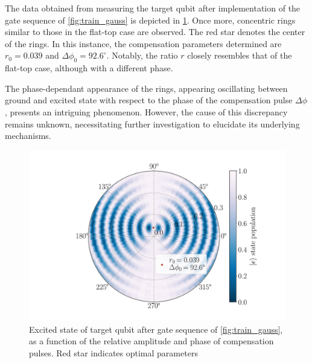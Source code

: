
The data obtained from measuring the target qubit after implementation of the gate sequence of \cref{fig:train_gauss} is depicted in \cref{fig:circle_pulsed}.
Once more, concentric rings similar to those in the flat-top case are observed.
The red star denotes the center of the rings. 
In this instance, the compensation parameters determined are $r_0 = 0.039$ and $\Delta \phi_0 = 92.6^\circ$.
Notably, the ratio $r$ closely resembles that of the flat-top case, although with a different phase.

The phase-dependant appearance of the rings, appearing oscillating between ground and excited state with respect to the phase of the compensation pulse $\Delta \phi$, presents an intriguing phenomenon.
However, the cause of this discrepancy remains unknown, necessitating further investigation to elucidate its underlying mechanisms.

\begin{figure}
    \centering
    \includegraphics[width=0.8\linewidth]{Images//Chap2.0/circles_pulsed.pdf}
    \vspace{-0.3cm}
    \caption{Excited state of target qubit after gate sequence of  \cref{fig:train_gauss}, as a function of the relative amplitude and phase of compensation pulses. Red star indicates optimal parameters}
    \label{fig:circle_pulsed}
\end{figure}

